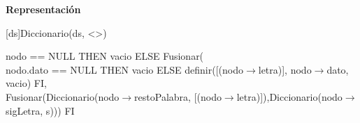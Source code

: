 \documentclass[a4paper,10pt]{article}
\newenvironment{Representacion}{%
  \vspace*{2ex}%
  \noindent\textbf{\Large Representación}%
  \vspace*{2ex}%
}{}
\newcommand{\DRef}{\ensuremath{\rightarrow}}
\begin{document}
\begin{Representacion}
  
  \BlankLine
 
  
 	 
  [ds]{Diccionario(ds, <>)}	
  \BlankLine
  
  \newpage
  
  {\IF nodo == NULL THEN vacio ELSE Fusionar( \\	
  {\IF nodo.dato == NULL THEN vacio ELSE definir([(nodo$\rightarrow$letra)], nodo$\rightarrow$dato, vacio) FI}, \\ Fusionar(Diccionario(nodo$\rightarrow$restoPalabra, [(nodo$\rightarrow$letra)]),Diccionario(nodo$\rightarrow$sigLetra, s))) FI}
  
  \BlankLine
  

\end{Representacion}
\end{document}
